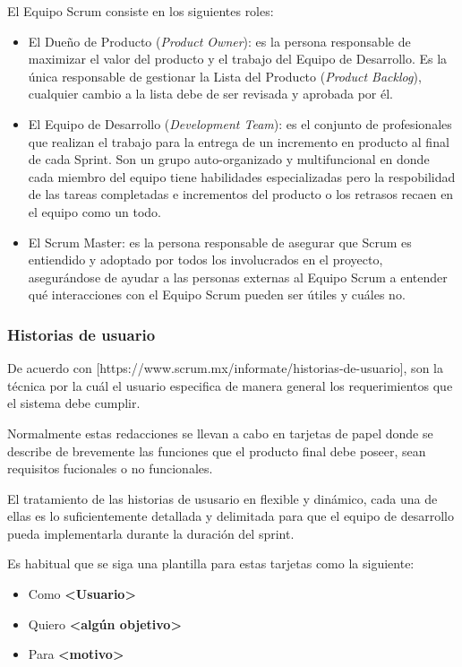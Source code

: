 \noindent El Equipo Scrum consiste en los siguientes roles:
\begin{itemize}
	\item El Dueño de Producto (\textit{Product Owner}): es la persona responsable de maximizar el valor del producto y el trabajo del Equipo de Desarrollo. Es la única responsable de gestionar la Lista del Producto (\textit{Product Backlog}), cualquier cambio a la lista debe de ser revisada y aprobada por él.
	\item El Equipo de Desarrollo (\textit{Development Team}): es el conjunto de profesionales que realizan el trabajo para la entrega de un incremento en producto al final de cada Sprint. Son un grupo auto-organizado y multifuncional en donde cada miembro del equipo tiene habilidades especializadas pero la respobilidad de las tareas completadas e incrementos del producto o los retrasos recaen en el equipo como un todo.
	\item  El Scrum Master: es la persona responsable de asegurar que Scrum es entiendido y adoptado por todos los involucrados en el proyecto, asegurándose de ayudar a las personas externas al Equipo Scrum a entender qué interacciones con el Equipo Scrum pueden ser útiles y cuáles no.
\end{itemize}


\subsubsection{Historias de usuario}

De acuerdo con [https://www.scrum.mx/informate/historias-de-usuario], son la técnica por la cuál el usuario especifica de manera general
los requerimientos que el sistema debe cumplir.


Normalmente estas redacciones se llevan a cabo en tarjetas de papel donde se describe de brevemente las funciones que el producto final
debe poseer, sean requisitos fucionales o no funcionales.


El tratamiento de las historias de ususario en flexible y dinámico, cada una de ellas es lo suficientemente detallada y delimitada para que el equipo de desarrollo pueda implementarla durante la duración del sprint.

Es habitual que se siga una plantilla para estas tarjetas como la siguiente:

\begin{itemize}
	\item Como \textbf{<Usuario>}
	\item Quiero \textbf{<algún objetivo>}
	\item Para \textbf{<motivo>}
\end{itemize}


